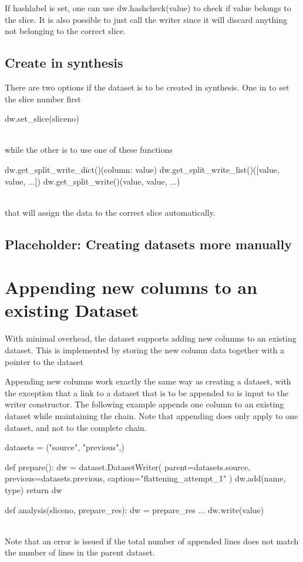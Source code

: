 If hashlabel is set, one can use dw.hashcheck(value) to check if value
belongs to the slice.  It is also possible to just call the writer
since it will discard anything not belonging to the correct slice.



\subsection{Create in synthesis}

There are two options if the dataset is to be created in synthesis.
One in to set the slice number first

\begin{python}
  dw.set_slice(sliceno)
\end{python}
\\
while the other is to use one of these functions

\begin{python}
  dw.get_split_write_dict()({column: value})
  dw.get_split_write_list()([value, value, ...])
  dw.get_split_write()(value, value, ...)
\end{python}
\\
that will assign the data to the correct slice automatically.

\subsection{Placeholder:  Creating datasets more manually}


\newpage
\section{Appending new columns to an existing Dataset}

With minimal overhead, the dataset supports adding new columns to an
existing dataset.  This is implemented by storing the new column data
together with a pointer to the dataset

Appending new columns work exactly the same way as creating a dataset,
with the exception that a link to a dataset that is to be appended to
is input to the writer constructor.  The following example appends one
column to an existing dataset while maintaining the chain.  Note that
appending does only apply to one dataset, and not to the complete
chain.

\begin{python}
datasets = ("source", "previous",)

def prepare():
  dw = dataset.DatasetWriter(
    parent=datasets.source,
    previous=datasets.previous,
    caption="flattening_attempt_1"
  )
  dw.add(name, type)
  return dw

def analysis(sliceno, prepare_res):
  dw = prepare_res
  ...
  dw.write(value)
\end{python}
\\
Note that an error is issued if the total number of appended lines
does not match the number of lines in the parent dataset.
